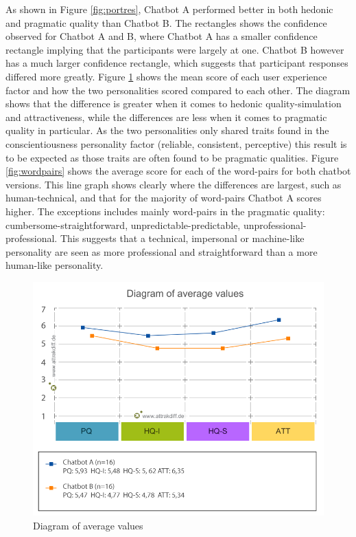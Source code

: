 As shown in Figure \ref{fig:portres}, Chatbot A performed better in both hedonic and pragmatic quality than Chatbot B. The rectangles shows the confidence observed for Chatbot A and B, where Chatbot A has a smaller confidence rectangle implying that the participants were largely at one. Chatbot B however has a much larger confidence rectangle, which suggests that participant responses differed more greatly. Figure \ref{fig:diagval} shows the mean score of each user experience factor and how the two personalities scored compared to each other. The diagram shows that the difference is greater when it comes to hedonic quality-simulation and attractiveness, while the differences are less when it comes to pragmatic quality in particular. As the two personalities only shared traits found in the conscientiousness personality factor (reliable, consistent, perceptive) this result is to be expected as those traits are often found to be pragmatic qualities. Figure \ref{fig:wordpairs} shows the average score for each of the word-pairs for both chatbot versions. This line graph shows clearly where the differences are largest, such as human-technical, and that for the majority of word-pairs Chatbot A scores higher. The exceptions includes mainly word-pairs in the pragmatic quality: cumbersome-straightforward, unpredictable-predictable, unprofessional-professional. This suggests that a technical, impersonal or machine-like personality are seen as more professional and straightforward than a more human-like personality.

\begin{figure}[h]
    \centering
    \includegraphics[scale=0.25]{figures/Diagram-of-average-values.png}
    \caption{Diagram of average values}
    \label{fig:diagval}
\end{figure}

